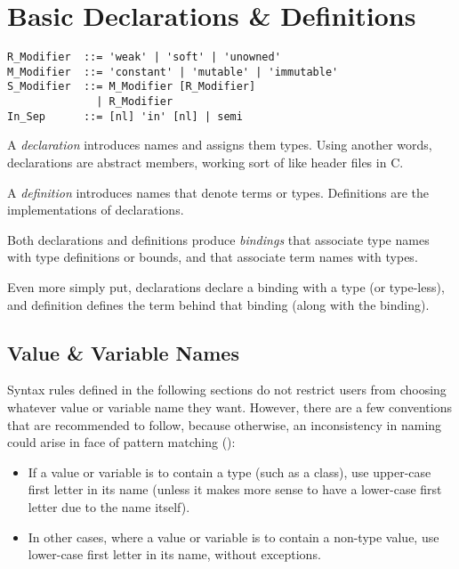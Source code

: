 
\chapter{Basic Declarations \& Definitions}

\minitoc

\newpage

\syntax\begin{lstlisting}
R_Modifier  ::= 'weak' | 'soft' | 'unowned'
M_Modifier  ::= 'constant' | 'mutable' | 'immutable'
S_Modifier  ::= M_Modifier [R_Modifier]
              | R_Modifier
In_Sep      ::= [nl] 'in' [nl] | semi
\end{lstlisting}

A {\em declaration} introduces names and assigns them types. Using another words, declarations are abstract members, working sort of like header files in C. 

A {\em definition} introduces names that denote terms or types. Definitions are the implementations of declarations. 

Both declarations and definitions produce {\em bindings} that associate type names with type definitions or bounds, and that associate term names with types. 

Even more simply put, declarations declare a binding with a type (or type-less), and definition defines the term behind that binding (along with the binding). 





\section{Value \& Variable Names}
\label{sec:val-var-names}

Syntax rules defined in the following sections do not restrict users from choosing whatever value or variable name they want. However, there are a few conventions that are recommended to follow, because otherwise, an inconsistency in naming could arise in face of pattern matching ():

\begin{itemize}
  \item If a value or variable is to contain a type (such as a class), use upper-case first letter in its name (unless it makes more sense to have a lower-case first letter due to the name itself). 
  \item In other cases, where a value or variable is to contain a non-type value, use lower-case first letter in its name, without exceptions. 
\end{itemize}

